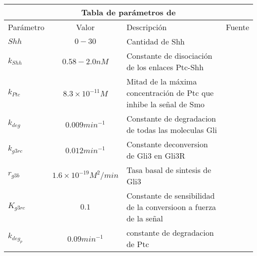 \begin{center}
	
	\begin{tabular}{ |p{3cm}||c|p{3cm}|p{3cm}|  }
		\hline
		\multicolumn{4}{|c|}{Tabla de parámetros de \cite{schaffer}  } \\
		\hline
		Parámetro & Valor & Descripción & Fuente\\
		\hline
		$Shh $  & $0-30$    &\tiny{Cantidad de Shh} &   \cite{cambon1}\\
		$k_{Shh}$ &  $ 0.58-2.0nM$  & \tiny{Constante de disociación de los enlaces Ptc-Shh}   & \cite{cambon1}\\
		$k_{Ptc} $ & $8.3\times10^{-11}M$ & \tiny{ Mitad de la máxima concentración de Ptc que inhibe la señal de Smo } &  \cite{cambon1}\\
		$k_{deg}$   &$0.009min^{-1} $ & \tiny{ Constante de degradacion de todas las moleculas Gli } &  \cite{cambon1}\\
		
		$k_{g3rc}$ &  $0.012min^{-1}$  & \tiny{ Constante deconversion de Gli3 en Gli3R} & \cite{schaffer}\\
		$r_{g3b}$ & $1.6\times10^{-19}M^2/min$  & \tiny{ Tasa basal de sintesis de Gli3 }   & \cite{schaffer}\\
		$K_{g3rc}$ & $0.1$ & \tiny{ Constante de sensibilidad de la conversioon a fuerza de la señal }   & \cite{schaffer}\\
		
		$k_{deg_p}$& $0.09min^{-1} $ &  \tiny{constante de degradacion de Ptc} & \cite{cambon1}\\
		
		\hline
	\end{tabular}
	
\end{center}